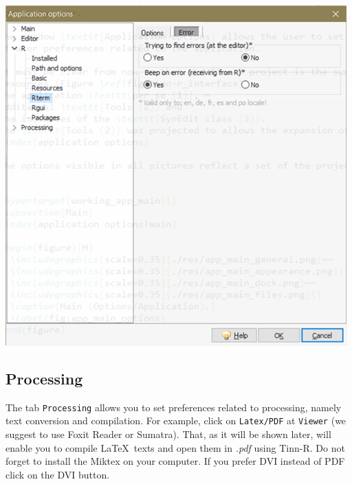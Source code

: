 \vspace{5mm}
\includegraphics[scale=0.8]{./res/app_r_rterm_error.png}\\
\vspace{5mm}

\subsection{Processing}

The tab \texttt{Processing} allows you to set preferences related to processing, namely text conversion and compilation.
For example, click on \texttt{Latex/PDF} at \texttt{Viewer} (we suggest to use Foxit Reader or Sumatra).
That, as it will be shown later, will enable you to compile \LaTeX ~texts and open them in \textit{.pdf} using Tinn-R.
Do not forget to install the Miktex on your computer. If you prefer DVI instead of PDF click on the DVI button.

